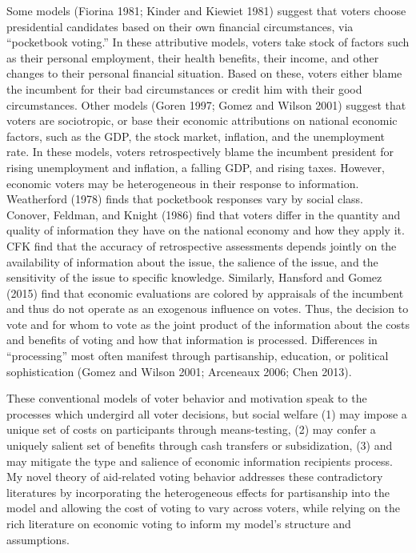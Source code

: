 \documentclass[12pt]{paper}
\begin{document}
Some models (Fiorina 1981; Kinder and Kiewiet 1981) suggest that voters choose presidential candidates based on their own financial circumstances, via “pocketbook voting.” In these attributive models, voters take stock of factors such as their personal employment, their health benefits, their income, and other changes to their personal financial situation. Based on these, voters either blame the incumbent for their bad circumstances or credit him with their good circumstances. Other models (Goren 1997; Gomez and Wilson 2001) suggest that voters are sociotropic, or base their economic attributions on national economic factors, such as the GDP, the stock market, inflation, and the unemployment rate. In these models, voters retrospectively blame the incumbent president for rising unemployment and inflation, a falling GDP, and rising taxes.  However, economic voters may be heterogeneous in their response to information. Weatherford (1978) finds that pocketbook responses vary by social class. Conover, Feldman, and Knight  (1986) find that voters differ in the quantity and quality of information they have on the national economy and how they apply it. CFK find that the accuracy of retrospective assessments depends jointly on the availability of information about the issue, the salience of the issue, and the sensitivity of the issue to specific knowledge. Similarly, Hansford and Gomez (2015) find that economic evaluations are colored by appraisals of the incumbent and thus do not operate as an exogenous influence on votes. Thus, the decision to vote and for whom to vote as the joint product of the information about the costs and benefits of voting and how that information is processed. Differences in “processing” most often manifest through partisanship, education, or political sophistication (Gomez and Wilson 2001; Arceneaux 2006; Chen 2013). 

These conventional models of voter behavior and motivation speak to the processes which undergird all voter decisions, but social welfare (1) may impose a unique set of costs on participants through means-testing, (2) may confer a uniquely salient set of benefits through cash transfers or subsidization, (3) and may mitigate the type and salience of economic information recipients process. My novel theory of aid-related voting behavior addresses these contradictory literatures by incorporating the heterogeneous effects for partisanship into the model and allowing the cost of voting to vary across voters, while relying on the rich literature on economic voting to inform my model's structure and assumptions.
\end{document}
